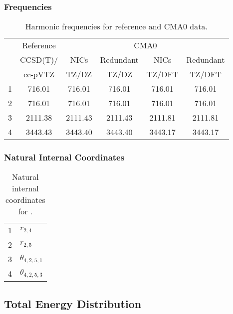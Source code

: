 \documentclass[10pt,oneside]{article}
\begin{document}
\begin{table}[h!]
\subsubsection*{Frequencies}
\centering
\caption{Harmonic frequencies for reference and CMA0 data.}
\begin{tabular}{cccccc}
\toprule
{} & Reference & \multicolumn{4}{c}{CMA0} \\
{} &  CCSD(T)/ &    NICs &  Redundant &    NICs & Redundant \\
{} &   cc-pVTZ &   TZ/DZ &      TZ/DZ &  TZ/DFT &    TZ/DFT \\
\midrule
1 &    716.01 &  716.01 &     716.01 &  716.01 &    716.01 \\
2 &    716.01 &  716.01 &     716.01 &  716.01 &    716.01 \\
3 &   2111.38 & 2111.43 &    2111.43 & 2111.81 &   2111.81 \\
4 &   3443.43 & 3443.40 &    3443.40 & 3443.17 &   3443.17 \\
\bottomrule
\end{tabular}
\end{table}

\begin{table}[h!]
\subsubsection*{Natural Internal Coordinates}
\centering
\caption{Natural internal coordinates for .}
\small
\begin{tabular}{ll}
\toprule
  1   & $r_{2,4}$ \\
  2   & $r_{2,5}$ \\
  3   & $\theta_{4,2,5,1}$ \\
  4   & $\theta_{4,2,5,3}$ \\
\bottomrule
\end{tabular}
\end{table}

\begin{table}
\subsection*{Total Energy Distribution}
\centering\end{table}

\clearpage

\subsection{}
\end{document}
